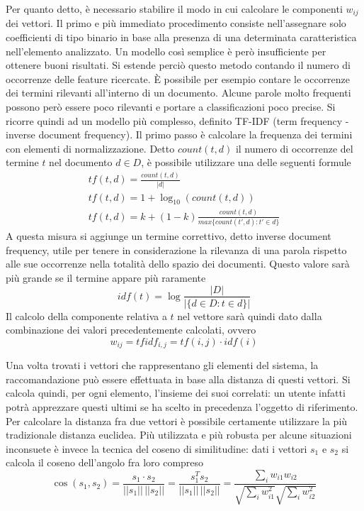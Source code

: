 \documentclass[Lau,binding=0.6cm,noexaminfo,oneside]{sapthesis}
\begin{document}
Per quanto detto, è necessario stabilire il modo in cui calcolare le componenti $w_{ij}$ dei vettori. Il primo e più immediato procedimento consiste nell'assegnare solo coefficienti di tipo binario in base alla presenza di una determinata caratteristica nell'elemento analizzato. Un modello così semplice è però insufficiente per ottenere buoni risultati. Si estende perciò questo metodo contando il numero di occorrenze delle feature ricercate.
\MakeUppercase{è} possibile per esempio contare le occorrenze dei termini rilevanti all'interno di un documento. Alcune parole molto frequenti possono però essere poco rilevanti e portare a classificazioni poco precise. Si ricorre quindi ad un modello più complesso, definito TF-IDF (term frequency - inverse document frequency). Il primo passo è calcolare la frequenza dei termini con elementi di normalizzazione. Detto $count(t,d)$ il numero di occorrenze del termine $t$ nel documento $d \in D$, è possibile utilizzare una delle seguenti formule
\begin{gather*}
  t\!f(t,d) = \frac{count(t,d)}{|d|} \\
  t\!f(t,d) = 1 + \log_{10}(count(t,d)) \\
  t\!f(t,d) = k + (1-k) \frac{count(t,d)}{max\{count(t',d) : t' \in d\}}
\end{gather*}
A questa misura si aggiunge un termine correttivo, detto inverse document frequency, utile per tenere in considerazione la rilevanza di una parola rispetto alle sue occorrenze nella totalità dello spazio dei documenti. Questo valore sarà più grande se il termine appare più raramente
\[
idf(t) = \log \frac{|D|}{|\{d \in D : t \in d\}|}
\]
Il calcolo della componente relativa a $t$ nel vettore sarà quindi dato dalla combinazione dei valori precedentemente calcolati, ovvero
\[
w_{ij} = t\!fidf_{i,j} = t\!f(i,j) \cdot idf(i)
\]

\medskip

Una volta trovati i vettori che rappresentano gli elementi del sistema, la raccomandazione può essere effettuata in base alla distanza di questi vettori. Si calcola quindi, per ogni elemento, l'insieme dei suoi correlati: un utente infatti potrà apprezzare questi ultimi se ha scelto in precedenza l'oggetto di riferimento. Per calcolare la distanza fra due vettori è possibile certamente utilizzare la più tradizionale distanza euclidea. Più utilizzata e più robusta per alcune situazioni inconsuete è invece la tecnica del coseno di similitudine: dati i vettori $s_1$ e $s_2$ si calcola il coseno dell'angolo fra loro compreso
\[
\cos(s_1, s_2) = \frac{s_1 \cdot s_2}{||s_1|| \, ||s_2||} = \frac{s_1^T s_2}{||s_1|| \, ||s_2||} = \frac{\sum_{i} w_{i1} w_{i2}}{\sqrt{\sum_{i} w_{i1}^2} \sqrt{\sum_{i} w_{i2}^2}}
\]
\end{document}
